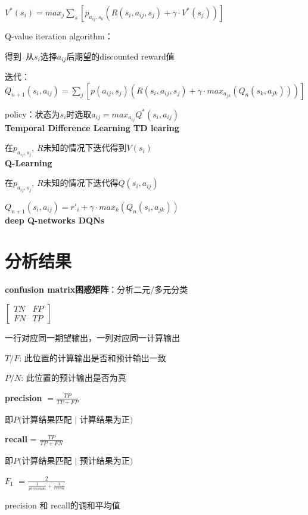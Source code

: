 \documentclass[UTF8]{ctexart}
\begin{document}
  \quad $V^*(s_i) = max_j \sum_s [p_{a_{ij}, s_k} (R(s_i, a_{ij}, s_j) + \gamma \cdot V^*(s_j))]$
  
  Q-value iteration algorithm：

  \quad 得到\ 从$s_i$选择$a_{ij}$后期望的discounted reward值

  \quad 迭代：$Q_{n+1}(s_i, a_{ij}) = \sum_j [p(a_{ij}, s_j) (R(s_i, a_{ij}, s_j) + \gamma \cdot max_{a_{jk}} (Q_n(s_k, a_{jk})))]$
  
  policy：状态为$s_i$时选取$a_{ij} = max_{a_{ij}} Q^*(s_i, a_{ij})$\\
\textbf{Temporal Difference Learning TD learing}

  在$p_{a_{ij}, s_j}$, $R$未知的情况下迭代得到$V(s_i)$\\
\textbf{Q-Learning}

  在$p_{a_{ij}, s_j}$, $R$未知的情况下迭代得$Q(s_i, a_{ij})$

  $Q_{n+1}(s_i, a_{ij}) = r'_i + \gamma \cdot max_k (Q_{n}(s_i, a_{jk}))$\\
\textbf{deep Q-networks DQNs}

  
\section{分析结果}
\noindent \textbf{confusion matrix困惑矩阵}：分析二元/多元分类
  
  $\begin{bmatrix}
    TN & FP \\
    FN & TP
  \end{bmatrix}$

  一行对应同一期望输出，一列对应同一计算输出

  $T/F$: 此位置的计算输出是否和预计输出一致

  $P/N$: 此位置的预计输出是否为真

  \textbf{precision} $= \frac{TP}{TP + FP}$

  \quad 即$P($计算结果匹配 $|$ 计算结果为正$)$

  \textbf{recall} = $\frac{TP}{TP + FN}$

  \quad 即$P($计算结果匹配 $|$ 预计结果为正$)$

  \textbf{$F_1$} $= \frac{2}{\frac{1}{precision} + \frac{1}{recall}}$ 
  
  \quad precision 和 recall的调和平均值
  
\end{document}
